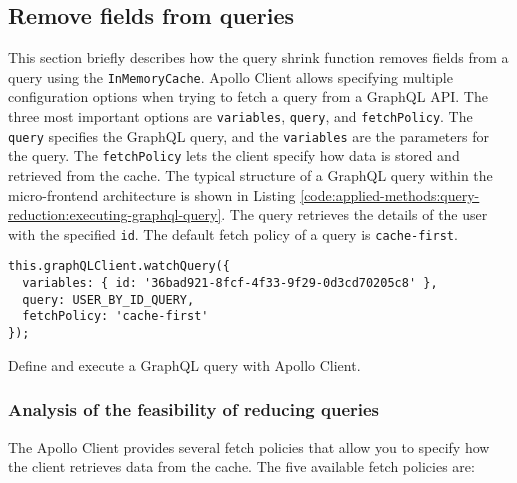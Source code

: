 \subsection{Remove fields from queries}\label{subsection:applied-methods:query-reduction:how-does-the-library-work}

This section briefly describes how the query shrink function removes fields from a query using the \texttt{InMemoryCache}. Apollo Client allows specifying multiple configuration options when trying to fetch a query from a GraphQL \ac{API}. The three most important options are \texttt{variables}, \texttt{query}, and \texttt{fetchPolicy}. The \texttt{query} specifies the GraphQL query, and the \texttt{variables} are the parameters for the query. The \texttt{fetchPolicy} lets the client specify how data is stored and retrieved from the cache. The typical structure of a GraphQL query within the micro-frontend architecture is shown in Listing \ref{code:applied-methods:query-reduction:executing-graphql-query}. The query retrieves the details of the user with the specified \texttt{id}. The default fetch policy of a query is \texttt{cache-first}.   

\ifshowListings
  \begin{listing}[H]
  \begin{verbatim}
this.graphQLClient.watchQuery({
  variables: { id: '36bad921-8fcf-4f33-9f29-0d3cd70205c8' },
  query: USER_BY_ID_QUERY,
  fetchPolicy: 'cache-first'
});
  \end{verbatim}
  \caption{Define and execute a GraphQL query with Apollo Client.}\label{code:applied-methods:query-reduction:executing-graphql-query}
  \end{listing}
\fi

\subsubsection{Analysis of the feasibility of reducing queries}

The Apollo Client provides several fetch policies that allow you to specify how the client retrieves data from the cache. The five available fetch policies are: \cite{misc:-:applied-methods:query-reduction:apollo-client:queries}

